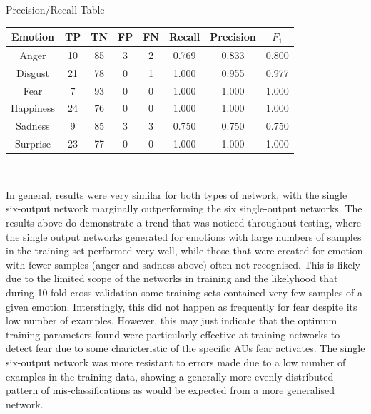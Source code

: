 \documentclass[a4paper]{article}
\begin{document}
  \begin{center}
  
  Precision/Recall Table\\
  
  \begin{tabular}{c|cccc|ccc}
    Emotion & TP & TN & FP & FN & Recall & Precision & $F_1$ \\
    \hline
    Anger & 10 & 85 & 3 & 2 & 0.769	& 0.833	& 0.800 \\
  Disgust & 21 & 78 & 0 & 1 & 1.000	& 0.955	& 0.977 \\
     Fear & 7 & 93 & 0 & 0 & 1.000	& 1.000	& 1.000\\
Happiness & 24 & 76 & 0 & 0 & 1.000 & 1.000 & 1.000 \\
  Sadness & 9 & 85 & 3 & 3 & 0.750	& 0.750	& 0.750\\
 Surprise & 23 & 77 & 0 & 0 & 1.000	& 1.000	& 1.000 \\
  \end{tabular}\\
  \end{center}



In general, results were very similar for both types of network, with the single six-output network marginally outperforming the six single-output
networks. The results above do demonstrate a trend that was noticed throughout testing, where the single output networks generated for emotions with
large numbers of samples in the training set performed very well, while those that were created for emotion with fewer samples (anger and sadness 
above) often not recognised. This is likely due to the limited scope of the networks in training and the likelyhood that during 10-fold cross-validation
some training sets contained very few samples of a given emotion. Interstingly, this did not happen as frequently for fear despite its low number
of examples. However, this may just indicate that the optimum training parameters found were particularly effective at training networks to detect
fear due to some charicteristic of the specific AUs fear activates. The single six-output network was more resistant to errors made due to a low
number of examples in the training data, showing a generally more evenly distributed pattern of mis-classifications as would be expected from a
more generalised network.
\end{document}
